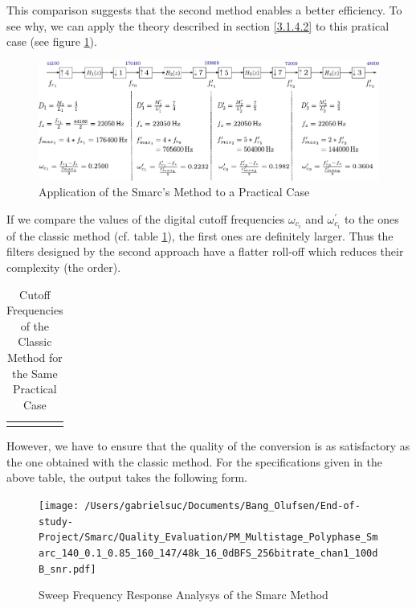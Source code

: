 This comparison suggests that the second method enables a better efficiency. To see why, we can apply the theory described in section \ref{3.1.4.2} to this pratical case (see figure \ref{Figure 3.27}). 

\begin{figure}[ht!]
	\hspace*{-1cm}
	\centering
	\includegraphics[scale=0.8]{smarc.pdf}
	\caption{Application of the Smarc's Method to a Practical Case}\label{Figure 3.27}
\end{figure}

If we compare the values of the digital cutoff frequencies $\omega_{c_i}$ and $\omega^{\prime}_{c_i}$ to the ones of the classic method (cf. table \ref{tab:cutoff_classic}), the first ones are definitely larger. Thus the filters designed by the second approach have a flatter roll-off which reduces their complexity (the order). 


\begin{table}[ht!]
	\centering
	\begin{tabular}{|c|c|c|c|}\hline
		 \makebox[8em]{Stage 1} &  \makebox[8em]{Stage 2} &  \makebox[8em]{Stage 3} &  \makebox[8em]{Stage 3}\\ \hline
		 \makebox[8em]{$\omega_{c_1} = 0.2500$} &  \makebox[8em]{$\omega_{c_2} = 0.1429$} &  \makebox[8em]{$\omega_{c_3} = 0.1429$} &  \makebox[8em]{$\omega_{c_4} = 0.3333$}\\ \hline
	\end{tabular}
\captionsetup{width=0.95\linewidth}
\caption{Cutoff Frequencies of the Classic Method for the Same Practical Case}
\label{tab:cutoff_classic}
\end{table}


However, we have to ensure that the quality of the conversion is as satisfactory as the one obtained with the classic method.
For the specifications given in the above table, the output takes the following form. 

\begin{figure}[ht!]
	\centering
	\texttt{[image: /Users/gabrielsuc/Documents/Bang\_Olufsen/End-of-study-Project/Smarc/Quality\_Evaluation/PM\_Multistage\_Polyphase\_Smarc\_140\_0.1\_0.85\_160\_147/48k\_16\_0dBFS\_256bitrate\_chan1\_100dB\_snr.pdf]}
	\captionsetup{width=0.95\linewidth}
	\caption{Sweep Frequency Response Analysys of the Smarc Method}\label{Figure 3.28}
\end{figure}


